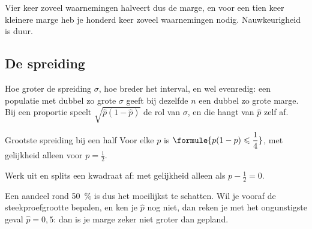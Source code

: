 Vier keer zoveel waarnemingen halveert dus de marge, en voor een tien keer kleinere marge heb je honderd keer zoveel waarnemingen nodig. Nauwkeurigheid is duur.


\begin{oefeningen}
\end{oefeningen}

\subsection{De spreiding}

Hoe groter de spreiding $\sigma$, hoe breder het interval, en wel evenredig: een populatie met dubbel zo grote $\sigma$ geeft bij dezelfde $n$ een dubbel zo grote marge. Bij een proportie speelt $\sqrt{\hat{p}(1 - \hat{p})}$ de rol van $\sigma$, en die hangt van $\hat{p}$ zelf af.

\begin{theorie}
\begin{stelling}{Grootste spreiding bij een half}
Voor elke $p$ is \quad $\formule{p(1 - p) \leqslant \dfrac14}$, \quad met gelijkheid alleen voor $p = \frac12$.
\end{stelling}

\begin{bewijs}
Werk uit en splits een kwadraat af:
met gelijkheid alleen als $p - \frac12 = 0$.
\end{bewijs}
\end{theorie}

Een aandeel rond 50~\% is dus het moeilijkst te schatten. Wil je vooraf de steekproefgrootte bepalen, en ken je $\hat{p}$ nog niet, dan reken je met het ongunstigste geval $\hat{p} = 0{,}5$: dan is je marge zeker niet groter dan gepland.


